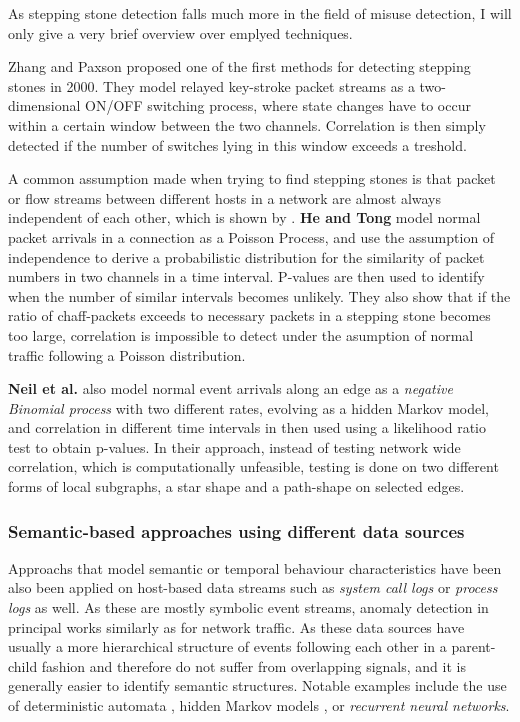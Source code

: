 \documentclass[a4paper,12pt,twoside]{report}
\begin{document}
As stepping stone detection falls much more in the field of misuse detection, I will only give a very brief overview over emplyed techniques.

Zhang and Paxson \cite{zhang2000detecting} proposed one of the first methods for detecting stepping stones in 2000. They model relayed key-stroke packet streams as a two-dimensional ON/OFF switching process, where state changes have to occur within a certain window between the two channels. Correlation is then simply detected if the number of switches lying in this window exceeds a treshold. 


A common assumption made when trying to find stepping stones is that packet or flow streams between different hosts in a network are almost always independent of each other, which is shown by \cite{neil2013scan}. \textbf{He and Tong}\cite{he2007detecting} model normal packet arrivals in a connection as a Poisson Process, and use the assumption of independence to derive a probabilistic distribution for the similarity of packet numbers in two channels in a time interval. P-values are then used to identify when the number of similar intervals becomes unlikely. They also show that if the ratio of chaff-packets exceeds to necessary packets in a stepping stone becomes too large, correlation is impossible to detect under the asumption of normal traffic following a Poisson distribution.


\textbf{Neil et al.}  \cite{neil2013scan} also model normal event arrivals along an edge as a \textit{negative Binomial process} with two different rates, evolving as a hidden Markov model, and correlation in different time intervals in then used  using a likelihood ratio test to obtain p-values. In their approach, instead of testing network wide correlation, which is computationally unfeasible, testing is done on two different forms of local subgraphs, a star shape and a path-shape on selected edges. 


\subsubsection*{Semantic-based approaches using different data sources}

Approachs that model semantic or temporal behaviour characteristics have been also been applied on host-based data streams such as \textit{system call logs} or \textit{process logs} as well. As these are mostly symbolic event streams, anomaly detection in principal works similarly as for network traffic. As these data sources have usually a more hierarchical structure of events following each other in a parent-child fashion and therefore do not suffer from overlapping signals, and it is generally easier to identify semantic structures. Notable examples include the use of deterministic automata \cite{warrender1999detecting}, hidden Markov models \cite{yeung2003host,hu2009simple}, or \textit{recurrent neural networks}\cite{du2017deeplog}.


\appendix



\end{document}
